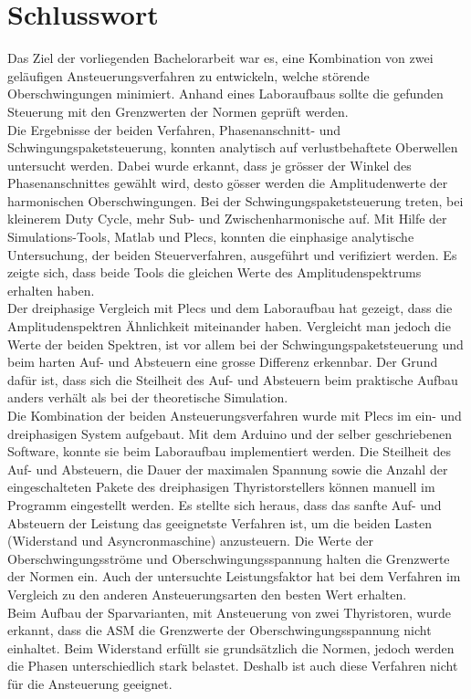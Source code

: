 \section{Schlusswort}
Das Ziel der vorliegenden Bachelorarbeit war es, eine Kombination von zwei geläufigen Ansteuerungsverfahren zu entwickeln, welche störende Oberschwingungen minimiert. Anhand eines Laboraufbaus sollte die gefunden Steuerung mit den Grenzwerten der Normen geprüft werden.\\ 
Die Ergebnisse der beiden Verfahren, Phasenanschnitt- und Schwingungspaketsteuerung, konnten analytisch auf verlustbehaftete Oberwellen untersucht werden. Dabei wurde erkannt, dass je grösser der Winkel des Phasenanschnittes gewählt wird, desto gösser werden die Amplitudenwerte der harmonischen Oberschwingungen. Bei der Schwingungspaketsteuerung treten, bei kleinerem Duty Cycle, mehr Sub- und Zwischenharmonische auf. Mit Hilfe der Simulations-Tools, Matlab und Plecs, konnten die einphasige analytische Untersuchung, der beiden Steuerverfahren, ausgeführt und verifiziert werden. Es zeigte sich, dass beide Tools die gleichen Werte des Amplitudenspektrums erhalten haben.\\ 
Der dreiphasige Vergleich mit Plecs und dem Laboraufbau hat gezeigt, dass die Amplitudenspektren Ähnlichkeit miteinander haben. Vergleicht man jedoch die Werte der beiden Spektren, ist vor allem bei der Schwingungspaketsteuerung und beim harten Auf- und Absteuern eine grosse Differenz erkennbar. Der Grund dafür ist, dass sich die Steilheit des Auf- und Absteuern beim praktische Aufbau anders verhält als bei der theoretische Simulation.\\
Die Kombination der beiden Ansteuerungsverfahren wurde mit Plecs im ein- und dreiphasigen System aufgebaut. Mit dem Arduino und der selber geschriebenen Software, konnte sie beim Laboraufbau implementiert werden. Die Steilheit des Auf- und Absteuern, die Dauer der maximalen Spannung sowie die Anzahl der eingeschalteten Pakete des dreiphasigen Thyristorstellers können manuell im Programm eingestellt werden. Es stellte sich heraus, dass das sanfte Auf- und Absteuern der Leistung das geeignetste Verfahren ist, um die beiden Lasten (Widerstand und Asyncronmaschine) anzusteuern. Die Werte der Oberschwingungsströme und Oberschwingungsspannung halten die Grenzwerte der Normen ein. Auch der untersuchte Leistungsfaktor hat bei dem Verfahren im Vergleich zu den anderen Ansteuerungsarten den besten Wert erhalten.\\
Beim Aufbau der Sparvarianten, mit Ansteuerung von zwei Thyristoren, wurde erkannt, dass die ASM die Grenzwerte der Oberschwingungsspannung nicht einhaltet. Beim Widerstand erfüllt sie grundsätzlich die Normen, jedoch werden die Phasen unterschiedlich stark belastet. Deshalb ist auch diese Verfahren nicht für die Ansteuerung geeignet.\\
